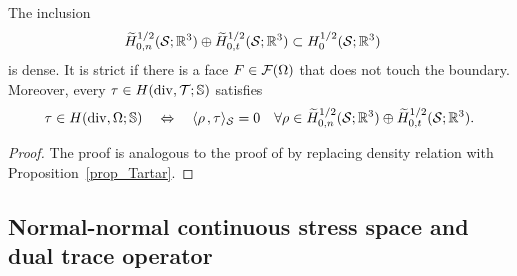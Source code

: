 \documentclass[11pt]{article}
\begin{document}
\begin{prop}[inclusion] \label{prop_cont}
The inclusion
\begin{align*} 
   \widetilde H^{1/2}_{0,n}(\mathcal{S};\mathbb{R}^3)\oplus\widetilde H^{1/2}_{0,t}(\mathcal{S};\mathbb{R}^3) &\subset H^{1/2}_0(\mathcal{S};\mathbb{R}^3)
\end{align*}
is dense. It is strict if there is a face $F\in\mathcal{F}(\Omega)$ that does not touch
the boundary. Moreover, every $\tau\in H(\operatorname{div},\mathcal{T};\mathbb{S})$ satisfies
\[
   \tau\in H(\operatorname{div},\Omega;\mathbb{S})
   \quad\Leftrightarrow\quad
   \langle{}\rho\hspace*{.5mm},\tau\rangle_{\mathcal{S}} = 0\quad
   \forall \rho\in\widetilde H^{1/2}_{0,n}(\mathcal{S};\mathbb{R}^3)\oplus\widetilde H^{1/2}_{0,t}(\mathcal{S};\mathbb{R}^3).
\]
\end{prop}

\begin{proof}
The proof is analogous to the proof of \cite[Proposition~2, (3)]{CarstensenH_NNC}
by replacing density relation \cite[Lemma~17.3]{Tartar_07_ISS} with Proposition~\ref{prop_Tartar}.
\end{proof}

\subsection{Normal-normal continuous stress space and dual trace operator} \label{sec_trace_nn}
\end{document}
